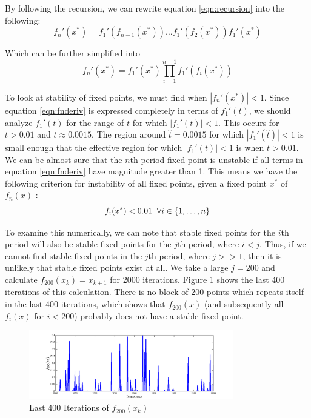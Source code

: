 \documentclass[12pt,journal,compsoc,twoside]{IEEEtran}
\begin{document}
By following the recursion, we can rewrite equation \ref{eqn:recursion} into the following:
\begin{equation}
f_n'(x^*) = f_1 '(f_{n-1}(x^*)) \ldots f_1 '(f_2(x^*)) f_1 '(x^*) 
\end{equation}

Which can be further simplified into
\begin{equation}
f_n'(x^*) = f_1'(x^*) \prod_{i = 1}^{n-1} f_1 '(f_i (x^*))
\label{eqn:fnderiv}
\end{equation} 

To look at stability of fixed points, we must find when $|f_n'(x^*)| < 1$. Since equation \ref{eqn:fnderiv} is expressed completely in terms of $f_1'(t)$, we should analyze $f_1'(t)$ for the range of $t$ for which $|f_1'(t)| < 1$. This occurs for $t > 0.01$ and $t \approx 0.0015$. The region around $\hat{t} = 0.0015$ for which $|f_1'(\hat{t})| < 1$ is small enough that the effective region for which $|f_1'(t)| < 1$ is when $t > 0.01$. We can be almost sure that the $n$th period fixed point is unstable if all terms in equation \ref{eqn:fnderiv} have magnitude greater than 1. This means we have the following criterion for instability of all fixed points, given a fixed point $x^*$ of $f_n(x)$ :
\begin{equation}
f_i(x^*) < 0.01 \hspace{0.2cm} \forall i \in \{1,\ldots,n\} 
\end{equation}

To examine this numerically, we can note that stable fixed points for the $i$th period will also be stable fixed points for the $j$th period, where $i < j$. Thus, if we cannot find stable fixed points in the $j$th period, where $j >> 1$, then it is unlikely that stable fixed points exist at all. We take a large $j = 200$ and calculate $f_{200}(x_k) = x_{k+1}$ for $2000$ iterations. Figure \ref{fptransient} shows the last 400 iterations of this calculation. There is no block of 200 points which repeats itself in the last $400$ iterations, which shows that $f_{200}(x)$ (and subsequently all $f_i(x)$ for $i < 200$) probably does not have a stable fixed point. 

\begin{figure}[h!]
\centering
\includegraphics[width=3.5in]{fptransient.png}
\caption{Last 400 Iterations of $f_{200}(x_k)$}
\label{fptransient}
\end{figure}
\end{document}
